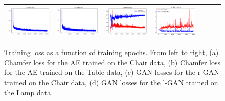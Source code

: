 \documentclass[12pt]{article}
\begin{document}
    \begin{figure}
        \centering
        \begin{tabular}{lllllll}
            \includegraphics[width = 30mm]{chair_l_gan_curves} &
            \includegraphics[width = 30mm]{table_l_gan_curves} &
            \includegraphics[width = 30mm]{chair_raw_gan_curves} &
            \includegraphics[width = 30mm]{lamp_raw_gan_curves} \\
        \end{tabular}
        \caption{Training loss as a function of training epochs. From left to right, (a) Chamfer loss for the AE trained on the Chair data, (b) Chamfer loss for the AE trained on the Table data, (c) GAN losses for the r-GAN trained on the Chair data, (d) GAN losses for the l-GAN trained on the Lamp data.}
        \label{figure:curves_for_latent_gan_and_raw_gan}
    \end{figure}
\end{document}
